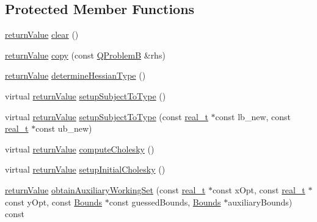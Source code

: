 \subsection*{Protected Member Functions}
\begin{DoxyCompactItemize}
\item 
\hyperlink{_message_handling_8hpp_a81d556f613bfbabd0b1f9488c0fa865e}{return\+Value} \hyperlink{class_q_problem_b_a957104bb5ebd44cd9d37878c2b6e8a52}{clear} ()
\item 
\hyperlink{_message_handling_8hpp_a81d556f613bfbabd0b1f9488c0fa865e}{return\+Value} \hyperlink{class_q_problem_b_aeb2920c00630c6643b05c8ee10d717ac}{copy} (const \hyperlink{class_q_problem_b}{Q\+ProblemB} \&rhs)
\item 
\hyperlink{_message_handling_8hpp_a81d556f613bfbabd0b1f9488c0fa865e}{return\+Value} \hyperlink{class_q_problem_b_a05462a04d6ecec9f2f3d32b868ec546b}{determine\+Hessian\+Type} ()
\item 
virtual \hyperlink{_message_handling_8hpp_a81d556f613bfbabd0b1f9488c0fa865e}{return\+Value} \hyperlink{class_q_problem_b_a4aa7da7c8454c0e53e65f923cd5c6e21}{setup\+Subject\+To\+Type} ()
\item 
virtual \hyperlink{_message_handling_8hpp_a81d556f613bfbabd0b1f9488c0fa865e}{return\+Value} \hyperlink{class_q_problem_b_a9b170181bd826023ce43c3df3ff463e7}{setup\+Subject\+To\+Type} (const \hyperlink{qp_o_a_s_e_s__wrapper_8h_a0d00e2b3dfadee81331bbb39068570c4}{real\+\_\+t} $\ast$const lb\+\_\+new, const \hyperlink{qp_o_a_s_e_s__wrapper_8h_a0d00e2b3dfadee81331bbb39068570c4}{real\+\_\+t} $\ast$const ub\+\_\+new)
\item 
virtual \hyperlink{_message_handling_8hpp_a81d556f613bfbabd0b1f9488c0fa865e}{return\+Value} \hyperlink{class_q_problem_b_a5f9fa59b80f990a897ba783e89dd03d3}{compute\+Cholesky} ()
\item 
virtual \hyperlink{_message_handling_8hpp_a81d556f613bfbabd0b1f9488c0fa865e}{return\+Value} \hyperlink{class_q_problem_b_afe7b38887f4823cecc668b99299d145b}{setup\+Initial\+Cholesky} ()
\item 
\hyperlink{_message_handling_8hpp_a81d556f613bfbabd0b1f9488c0fa865e}{return\+Value} \hyperlink{class_q_problem_b_aab3ae0a0bfec358313752467edbbb34f}{obtain\+Auxiliary\+Working\+Set} (const \hyperlink{qp_o_a_s_e_s__wrapper_8h_a0d00e2b3dfadee81331bbb39068570c4}{real\+\_\+t} $\ast$const x\+Opt, const \hyperlink{qp_o_a_s_e_s__wrapper_8h_a0d00e2b3dfadee81331bbb39068570c4}{real\+\_\+t} $\ast$const y\+Opt, const \hyperlink{class_bounds}{Bounds} $\ast$const guessed\+Bounds, \hyperlink{class_bounds}{Bounds} $\ast$auxiliary\+Bounds) const

\end{DoxyCompactItemize}
